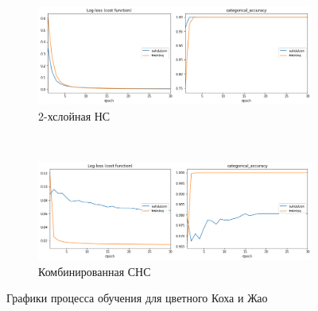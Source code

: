 \begin{figure}[p]
    \centering

    \begin{subfigure}{\textwidth}
        \includegraphics[width=\textwidth]{include/graphics/experimental_plots/color/french_koch}
                            \caption{2-хслойная НС}
    \end{subfigure}
    ~
    \begin{subfigure}{\textwidth}
        \includegraphics[width=\textwidth]{include/graphics/experimental_plots/color/mixed_koch}
                    \caption{Комбинированная СНС}
    \end{subfigure}

    \caption{Графики процесса обучения для цветного Коха и Жао}
    \label{fig:ColorPlotsKoch}
\end{figure}

